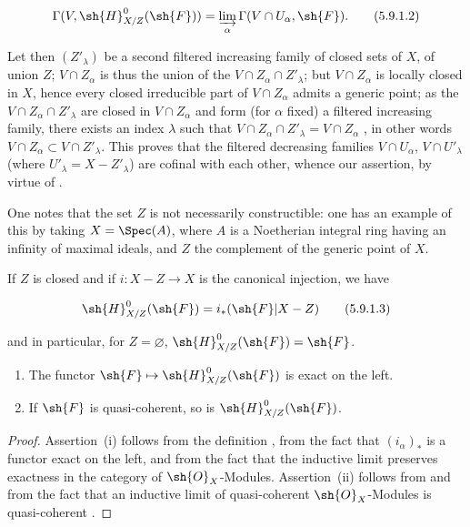 \begin{equation}
\label{IV.5.9.1.2}
\Gamma(V,\sh{H}^0_{X/Z}(\sh{F}))=\varinjlim_\alpha \Gamma(V\cap U_\alpha,\sh{F}). \tag{5.9.1.2}
\end{equation}

Let then $(Z'_\lambda)$ be a second filtered increasing family of closed sets of $X$, of union $Z$; $V\cap Z_\alpha$ is thus the union of the $V\cap Z_\alpha\cap Z'_\lambda$; but $V\cap Z_\alpha$ is locally closed in $X$, hence every closed irreducible part of $V\cap Z_\alpha$ admits a generic point; as the $V\cap Z_\alpha\cap Z'_\lambda$ are closed in $V\cap Z_\alpha$ and form (for $\alpha$ fixed) a filtered increasing family, there exists an index $\lambda$ such that $V\cap Z_\alpha\cap Z'_\lambda=V\cap Z_\alpha$ , in other words $V\cap Z_\alpha\subset V\cap Z'_\lambda$.
This proves that the filtered decreasing families $V\cap U_\alpha$, $V\cap U'_\lambda$ (where $U'_\lambda=X-Z'_\lambda$) are cofinal with each other, whence our assertion, by virtue of .


One notes that the set $Z$ is not necessarily constructible: one has an example of this by taking $X=\Spec(A)$, where $A$ is a Noetherian integral ring having an infinity of maximal ideals, and $Z$ the complement of the generic point of $X$.

If $Z$ is closed and if $i:X-Z\to X$ is the canonical injection, we have

\begin{equation}
\label{IV.5.9.1.3}
\sh{H}^0_{X/Z}(\sh{F})=i_*(\sh{F}|X-Z) \tag{5.9.1.3}
\end{equation}

and in particular, for $Z=\varnothing$, $\sh{H}^0_{X/Z}(\sh{F})=\sh{F}$.

\begin{proposition}[5.9.2]
\label{IV.5.9.2}
\begin{enumerate}[label=\emph{\roman*)}]
  \item The functor $\sh{F}\mapsto\sh{H}^0_{X/Z}(\sh{F})$ is exact on the left.
  \item If $\sh{F}$ is quasi-coherent, so is $\sh{H}^0_{X/Z}(\sh{F})$.
\end{enumerate}
\end{proposition}

\begin{proof}
Assertion~(i) follows from the definition , from the fact that $(i_\alpha)_*$ is a functor exact on the left, and from the fact that the inductive limit preserves exactness in the category of $\sh{O}_X$-Modules.
Assertion~(ii) follows from  and from the fact that an inductive limit of quasi-coherent $\sh{O}_X$-Modules is quasi-coherent .
\end{proof}

